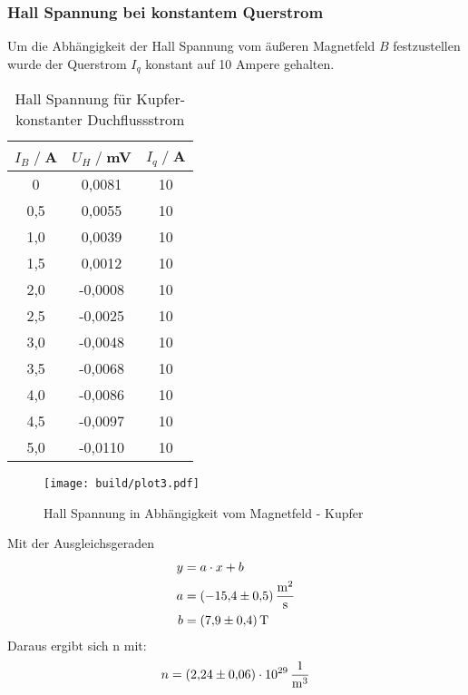 \subsubsection{Hall Spannung bei konstantem Querstrom}
Um die Abhängigkeit der Hall Spannung vom äußeren Magnetfeld $B$ festzustellen wurde der Querstrom $I_q$ konstant auf 10 Ampere gehalten.
\begin{table}
    \centering
    \begin{tabular}{c c c}
        \toprule
        $I_{B} \;/\;$A & $U_H\;/\;$mV & $I_{q} \;/\;$A\\
        \midrule
        0                   &0,0081              &10\\
        0,5                 &0,0055              &10\\
        1,0                 &0,0039              &10\\
        1,5                 &0,0012              &10\\
        2,0                 &-0,0008             &10\\
        2,5                 &-0,0025             &10\\
        3,0                 &-0,0048             &10\\
        3,5                 &-0,0068             &10\\
        4,0                 &-0,0086             &10\\
        4,5                 &-0,0097             &10\\
        5,0                 &-0,0110             &10\\
        \bottomrule
    \end{tabular}
    \caption{Hall Spannung für Kupfer- konstanter Duchflussstrom}
    \label{tab:Cu_B}
\end{table}
\begin{figure}[H]
    \centering
    \texttt{[image: build/plot3.pdf]}
    \caption{Hall Spannung in Abhängigkeit vom Magnetfeld - Kupfer}
    \label{fig:Cu_B}
\end{figure}
Mit der Ausgleichsgeraden
\begin{align*}
    y &= a \cdot x + b\\
    a &=  \SI{-15,4 \pm 0,5 }{\square \meter \per \second}\\
    b &=  \SI{7,9\pm0,4}{\tesla}\\
\end{align*}
Daraus ergibt sich n mit:
\begin{align}
    n = \SI{2,24\pm0,06 e29}{\per \cubic \metre}
\end{align}

